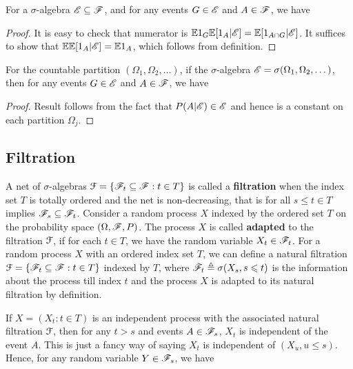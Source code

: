 \documentclass[letterpaper,10pt,english]{article}
\begin{document}
\begin{thm} 
For a $\sigma$-algebra $\mathscr{E} \subseteq \mathscr{F}$, and for any events $G \in \mathscr{E}$ and $A \in \mathscr{F}$, we have 
\end{thm}
\begin{proof}
It is easy to check that numerator is $\mathbb{E} 1_G\mathbb{E}[1_A|\mathscr{E}] = \mathbb{E}[1_{A \cap G}|\mathscr{E}]$. 
It suffices to show that $\mathbb{E}\mathbb{E}[1_A|\mathscr{E}] = \mathbb{E} 1_A$, which follows from definition. 
\end{proof}
\begin{cor} 
For the countable partition $(\Omega_1, \Omega_2, \dots)$, if the $\sigma$-algebra $\mathscr{E} = \sigma(\Omega_1, \Omega_2, \dots)$, then for any events $G \in \mathscr{E}$ and $A \in \mathscr{F}$, we have 
\end{cor}
\begin{proof}
Result follows from the fact that $P(A|\mathscr{E}) \in \mathscr{E}$ and hence is a constant on each partition $\Omega_j$. %
\end{proof}

\subsection{Filtration}
A net of $\sigma$-algebras $\mathcal{F} = \{\mathscr{F}_t \subseteq \mathscr{F}: t \in T\}$ is called a \textbf{filtration} when the index set $T$ is totally ordered and the net is non-decreasing, that is for all $s \leqslant t \in T$ implies $\mathscr{F}_s \subseteq \mathscr{F}_t$. 
Consider a random process $X$ indexed by the ordered set $T$ on the probability space $(\Omega, \mathscr{F}, P)$. 
The process $X$ is called \textbf{adapted} to the filtration $\mathcal{F}$, if for each $t \in T$, we have the random variable $X_t \in \mathscr{F}_t$. 
For a random process $X$ with an ordered index set $T$, we can define a natural filtration $\mathcal{F} = \{\mathscr{F}_t \subseteq \mathscr{F}: t \in T\}$ indexed by $T$, where  $\mathscr{F}_t \triangleq \sigma(X_s, s \leqslant t)$ is the information about the process till index $t$ and 
the process $X$ is adapted to its natural filtration by definition. 

If $X = (X_t: t \in T)$ is an independent process with the associated natural filtration $\mathcal{F}$, then for any $t > s$ and events $A \in \mathscr{F}_s$, 
$X_t$ is independent of the event $A$. 
This is just a fancy way of saying $X_t$ is independent of $(X_u, u \le s)$. 
Hence, for any random variable $Y \in \mathscr{F}_s$, we have 
\end{document}
